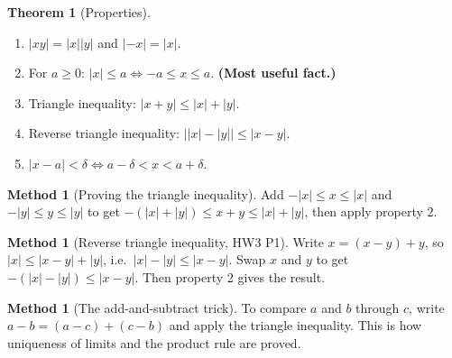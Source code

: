 \documentclass[11pt]{article}
\theoremstyle{definition}
\newtheorem{thm}[defn]{Theorem}
\newtheorem{method}[defn]{Method}
\newcommand{\key}[1]{\textcolor{red!70!black}{\textbf{#1}}}
\begin{document}
\begin{thm}[Properties]\
\begin{enumerate}[nosep]
  \item $|xy|=|x||y|$ and $|-x|=|x|$.
  \item For $a\ge0$: $|x|\le a\iff -a\le x\le a$. \key{(Most useful fact.)}
  \item Triangle inequality: $|x+y|\le|x|+|y|$.
  \item Reverse triangle inequality: $\bigl||x|-|y|\bigr|\le|x-y|$.
  \item $|x-a|<\delta\iff a-\delta<x<a+\delta$.
\end{enumerate}
\end{thm}

\begin{method}[Proving the triangle inequality]
Add $-|x|\le x\le|x|$ and $-|y|\le y\le|y|$ to get
$-(|x|+|y|)\le x+y\le|x|+|y|$, then apply property 2.
\end{method}

\begin{method}[Reverse triangle inequality, HW3 P1]
Write $x=(x-y)+y$, so $|x|\le|x-y|+|y|$, i.e.\ $|x|-|y|\le|x-y|$. Swap
$x$ and $y$ to get $-(|x|-|y|)\le|x-y|$. Then property 2 gives the result.
\end{method}

\begin{method}[The add-and-subtract trick]
To compare $a$ and $b$ through $c$, write $a-b=(a-c)+(c-b)$ and apply the
triangle inequality. This is how uniqueness of limits and the product rule
are proved.
\end{method}
\end{document}
